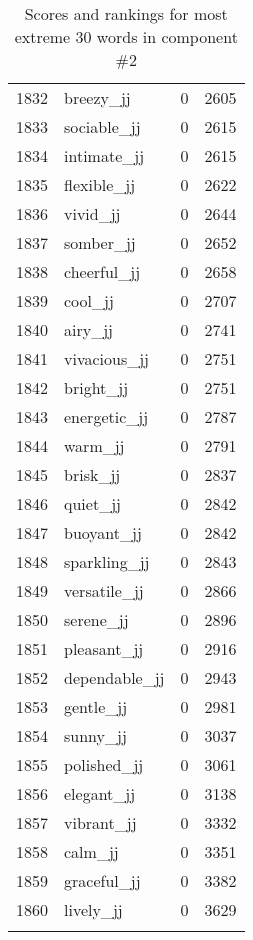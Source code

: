 \begin{longtable}[!htbp]{| rlr@{.}l |}
    1832 & breezy\_jj & 0 & 2605 \\
    1833 & sociable\_jj & 0 & 2615 \\
    1834 & intimate\_jj & 0 & 2615 \\
    1835 & flexible\_jj & 0 & 2622 \\
    1836 & vivid\_jj & 0 & 2644 \\
    1837 & somber\_jj & 0 & 2652 \\
    1838 & cheerful\_jj & 0 & 2658 \\
    1839 & cool\_jj & 0 & 2707 \\
    1840 & airy\_jj & 0 & 2741 \\
    1841 & vivacious\_jj & 0 & 2751 \\
    1842 & bright\_jj & 0 & 2751 \\
    1843 & energetic\_jj & 0 & 2787 \\
    1844 & warm\_jj & 0 & 2791 \\
    1845 & brisk\_jj & 0 & 2837 \\
    1846 & quiet\_jj & 0 & 2842 \\
    1847 & buoyant\_jj & 0 & 2842 \\
    1848 & sparkling\_jj & 0 & 2843 \\
    1849 & versatile\_jj & 0 & 2866 \\
    1850 & serene\_jj & 0 & 2896 \\
    1851 & pleasant\_jj & 0 & 2916 \\
    1852 & dependable\_jj & 0 & 2943 \\
    1853 & gentle\_jj & 0 & 2981 \\
    1854 & sunny\_jj & 0 & 3037 \\
    1855 & polished\_jj & 0 & 3061 \\
    1856 & elegant\_jj & 0 & 3138 \\
    1857 & vibrant\_jj & 0 & 3332 \\
    1858 & calm\_jj & 0 & 3351 \\
    1859 & graceful\_jj & 0 & 3382 \\
    1860 & lively\_jj & 0 & 3629 \\
    \hline
    \caption{Scores and rankings for most extreme 30 words in component \#2} \\
\end{longtable}
